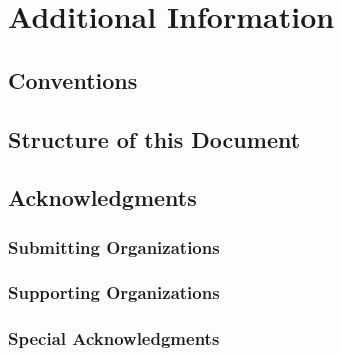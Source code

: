 \documentclass[11pt, showtrims, final, oldfontcommands]{memoir}
\begin{document}
	\chapter{Additional Information}
	\lipsum*[7]
	\section{Conventions}
	\section{Structure of this Document}
	\section{Acknowledgments}
	\subsection{Submitting Organizations}
	\subsection{Supporting Organizations}
	\subsection{Special Acknowledgments}
	
	\cleardoublepage
	
	
	\mainmatter
	
	
	
	
	
	
	 
	
	 
	
	\backmatter
	
	
	
\end{document}
